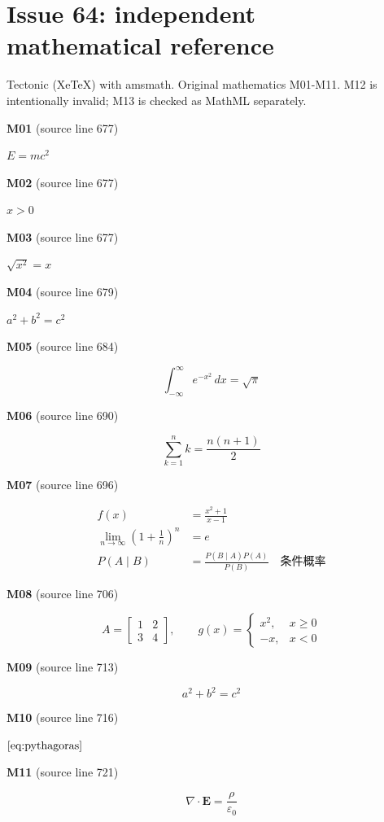 \documentclass[11pt,a4paper]{article}
\begin{document}
\section*{Issue 64: independent mathematical reference}
Tectonic (XeTeX) with amsmath. Original mathematics M01-M11.
M12 is intentionally invalid; M13 is checked as MathML separately.
\bigskip

\textbf{M01} (source line 677)

\(E = mc^2\)

\textbf{M02} (source line 677)

\(x > 0\)

\textbf{M03} (source line 677)

\(\sqrt{x^2} = x\)

\textbf{M04} (source line 679)

\(a^2 + b^2 = c^2\)

\textbf{M05} (source line 684)

\[
\int_{-\infty}^{\infty} e^{-x^2}\,dx = \sqrt{\pi}
\]

\textbf{M06} (source line 690)

\[
\sum_{k=1}^{n} k = \frac{n(n+1)}{2}
\]

\textbf{M07} (source line 696)

\[
\begin{aligned}
f(x) &= \frac{x^2 + 1}{x - 1} \\
\lim_{n\to\infty}\left(1+\frac{1}{n}\right)^n &= e \\
P(A\mid B) &= \frac{P(B\mid A)P(A)}{P(B)} \quad \text{条件概率}
\end{aligned}
\]

\textbf{M08} (source line 706)

\[
A = \begin{bmatrix}1 & 2 \\ 3 & 4\end{bmatrix},\qquad
g(x) = \begin{cases}x^2, & x \ge 0 \\ -x, & x < 0\end{cases}
\]

\textbf{M09} (source line 713)

\[
a^2 + b^2 = c^2 \tag{1}\label{eq:pythagoras}
\]

\textbf{M10} (source line 716)

\(\eqref{eq:pythagoras}\)

\textbf{M11} (source line 721)

\[
\nabla \cdot \mathbf{E} = \frac{\rho}{\varepsilon_0}
\]
\end{document}
